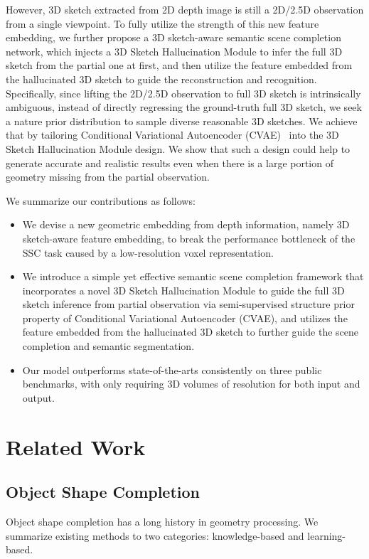 \documentclass[10pt,twocolumn,letterpaper]{article}
\begin{document}
However, 3D sketch extracted from 2D depth image is still a 2D/2.5D observation from a single viewpoint. To fully utilize the strength of this new feature embedding, we further propose a 3D sketch-aware semantic scene completion network, which injects a 3D Sketch Hallucination Module to infer the full 3D sketch from the partial one at first, and then utilize the feature embedded from the hallucinated 3D sketch to guide the reconstruction and recognition. Specifically, since lifting the 2D/2.5D observation to full 3D sketch is intrinsically ambiguous, instead of directly regressing the ground-truth full 3D sketch, we seek a nature prior distribution to sample diverse reasonable 3D sketches. We achieve that by tailoring Conditional Variational Autoencoder (CVAE)~\cite{sohn2015learning} into the
3D Sketch Hallucination Module design. We show that such a design could help to generate accurate and realistic results even when there is a large portion of geometry missing from the partial observation.

We summarize our contributions as follows: 
\begin{itemize}
    \item We devise a new geometric embedding from depth information, namely 3D sketch-aware feature embedding, to break the performance bottleneck of the SSC task caused by a low-resolution voxel representation.
    \item We introduce a simple yet effective semantic scene completion framework that incorporates a novel 3D Sketch Hallucination Module to guide the full 3D sketch inference from partial observation via semi-supervised structure prior property of Conditional Variational Autoencoder (CVAE), and utilizes the feature embedded from the hallucinated 3D sketch to further guide the scene completion and semantic segmentation.
    \item Our model outperforms state-of-the-arts consistently on three public benchmarks, with only requiring 3D volumes of  resolution for both input and output. 

\end{itemize}

\section{Related Work}
\subsection{Object Shape Completion}
Object shape completion has a long history in geometry processing. We summarize existing methods to two categories: knowledge-based and learning-based.
\end{document}
